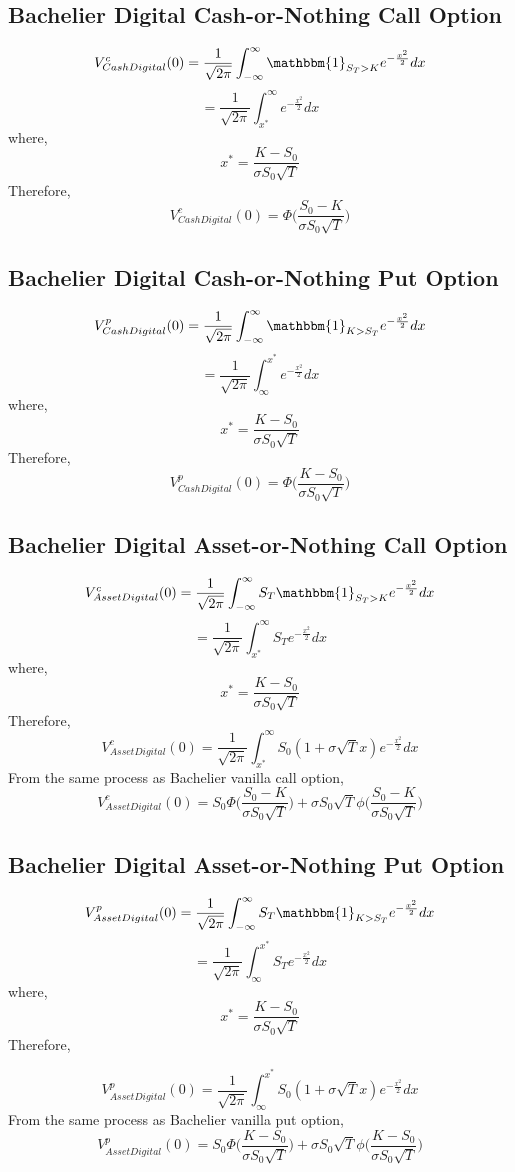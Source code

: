 \documentclass[fleqn,12pt]{SelfArx}
\begin{document}
\subsection{Bachelier Digital Cash-or-Nothing Call Option}
$$
V^{c}_{Cash Digital}(0) = \frac{1}{\sqrt{2\pi}}\int_{-\infty}^{\infty}\mathbbm{1}_{S_T>K}e^{-\frac{x^{2}}{2}}dx
$$
$$
= \frac{1}{\sqrt{2\pi}}\int_{x^{*}}^{\infty}e^{-\frac{x^{2}}{2}}dx
$$
where,
$$
x^{*} = \frac{K-S_0}{\sigma S_0\sqrt{T}}
$$
Therefore,
$$
V^{c}_{Cash Digital}(0) = \Phi\bigg(\frac{S_0-K}{\sigma S_0\sqrt{T}}\bigg)
$$

\subsection{Bachelier Digital Cash-or-Nothing Put Option}
$$
V^{p}_{Cash Digital}(0) = \frac{1}{\sqrt{2\pi}}\int_{-\infty}^{\infty}\mathbbm{1}_{K>S_T}e^{-\frac{x^{2}}{2}}dx
$$
$$
= \frac{1}{\sqrt{2\pi}}\int_{\infty}^{x^{*}}e^{-\frac{x^{2}}{2}}dx
$$
where,
$$
x^{*} = \frac{K-S_0}{\sigma S_0\sqrt{T}} 
$$
Therefore,
$$
V^{p}_{Cash Digital}(0) = \Phi\bigg(\frac{K-S_0}{\sigma S_0\sqrt{T}}\bigg)
$$
\subsection{Bachelier Digital Asset-or-Nothing Call Option}
$$
V^{c}_{Asset Digital}(0) = \frac{1}{\sqrt{2\pi}}\int_{-\infty}^{\infty}S_T\mathbbm{1}_{S_T>K}e^{-\frac{x^{2}}{2}}dx
$$
$$
= \frac{1}{\sqrt{2\pi}}\int_{x^{*}}^{\infty}S_Te^{-\frac{x^{2}}{2}}dx
$$
where,
$$
x^{*} = \frac{K-S_0}{\sigma S_0\sqrt{T}}
$$
Therefore,
$$
V^{c}_{Asset Digital}(0) = \frac{1}{\sqrt{2\pi}}\int_{x^{*}}^{\infty} S_0(1 + \sigma \sqrt{T}x)e^{-\frac{x^{2}}{2}}dx
$$
From the same process as Bachelier vanilla call option,
$$
V^{c}_{Asset Digital}(0) = S_0\Phi\bigg(\frac{S_0-K}{\sigma S_0\sqrt{T}}\Big) + \sigma S_0\sqrt{T}\phi\Big(\frac{S_0-K}{\sigma S_0\sqrt{T}}\bigg)
$$

\subsection{Bachelier Digital Asset-or-Nothing Put Option}
$$
V^{p}_{Asset Digital}(0) = \frac{1}{\sqrt{2\pi}}\int_{-\infty}^{\infty}S_T\mathbbm{1}_{K>S_T}e^{-\frac{x^{2}}{2}}dx
$$
$$
= \frac{1}{\sqrt{2\pi}}\int_{\infty}^{x^{*}}S_Te^{-\frac{x^{2}}{2}}dx
$$
where,
$$
x^{*} = \frac{K-S_0}{\sigma S_0\sqrt{T}} 
$$
Therefore,

$$
V^{p}_{Asset Digital}(0) = \frac{1}{\sqrt{2\pi}}\int_{\infty}^{x^{*}} S_0(1 + \sigma \sqrt{T}x)e^{-\frac{x^{2}}{2}}dx
$$
From the same process as Bachelier vanilla put option,
$$
V^{p}_{Asset Digital}(0) = S_0\Phi\bigg(\frac{K-S_0}{\sigma S_0\sqrt{T}}\bigg) + \sigma S_0\sqrt{T}\phi\bigg(\frac{K-S_0}{\sigma S_0\sqrt{T}}\bigg)
$$
\end{document}
